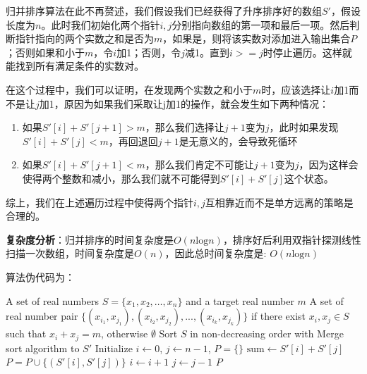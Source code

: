 \documentclass[UTF8,12pt,a4paper]{ctexart}
\begin{document}
\begin{enumerate}[1.]
	归并排序算法在此不再赘述，我们假设我们已经获得了升序排序好的数组$S'$，假设长度为$n$。此时我们初始化两个指针$i,j$分别指向数组的第一项和最后一项。然后判断指针指向的两个实数之和是否为$m$，如果是，则将该实数对添加进入输出集合$P$；否则如果和小于$m$，令$i$加1；否则，令$j$减1。直到$i>=j$时停止遍历。这样就能找到所有满足条件的实数对。

	在这个过程中，我们可以证明，在发现两个实数之和小于$m$时，应该选择让$i$加1而不是让$j$加1，原因为如果我们采取让j加1的操作，就会发生如下两种情况：

	\begin{enumerate}
		\item 如果$S'[i] + S'[j+1] > m$，那么我们选择让$j+1$变为$j$，此时如果发现$S'[i] + S'[j] < m$，再回退回$j+1$是无意义的，会导致死循环
		\item 如果$S'[i] + S'[j+1] < m$，那么我们肯定不可能让$j+1$变为$j$，因为这样会使得两个整数和减小，那么我们就不可能得到$S'[i] + S'[j]$这个状态。
	\end{enumerate}

	综上，我们在上述遍历过程中使得两个指针$i, j$互相靠近而不是单方远离的策略是合理的。

	\textbf{复杂度分析}：归并排序的时间复杂度是$O(n\text{log}n)$，排序好后利用双指针探测线性扫描一次数组，时间复杂度是$O(n)$，因此总时间复杂度是: $O(n\text{log}n)$

	算法伪代码为：
	\begin{algorithm}[H]
		\caption{Two-Sum Detection in Large Set}
		\begin{algorithmic}[1]
		\Require A set of real numbers $S = \{x_1, x_2, \dots, x_n\}$ and a target real number $m$
		\Ensure A set of real number pair $\{(x_{i_{1}}, x_{j_{1}}), (x_{i_{2}}, x_{j_{2}}), ..., (x_{i_{k}}, x_{j_{k}})\}$ if there exist $x_i, x_j \in S$ such that $x_i + x_j = m$, otherwise $\emptyset$
		\State Sort $S$ in non-decreasing order with Merge sort algorithm to $S'$
		\State Initialize $i \gets 0$, $j \gets n - 1$, $P=\{\}$
			\State $\text{sum} \gets S'[i] + S'[j]$
				\State $P = P\cup{\{(S'[i], S'[j])\}}$
				\State $i \gets i + 1$
			\Else
				\State $j \gets j - 1$
			\EndIf
		\EndWhile
		\State \Return $P$
		\end{algorithmic}
		\end{algorithm}
		
\end{enumerate}
\end{document}
